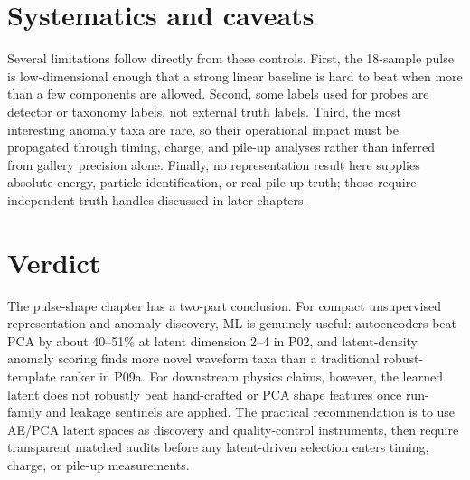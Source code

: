 \section{Systematics and caveats}

\begin{table}[H]
\centering
\caption{Main systematic controls for pulse-shape representation studies.}
\end{table}

Several limitations follow directly from these controls.  First, the 18-sample pulse is
low-dimensional enough that a strong linear baseline is hard to beat when more than a few
components are allowed.  Second, some labels used for probes are detector or taxonomy labels, not
external truth labels.  Third, the most interesting anomaly taxa are rare, so their operational
impact must be propagated through timing, charge, and pile-up analyses rather than inferred from
gallery precision alone.  Finally, no representation result here supplies absolute energy,
particle identification, or real pile-up truth; those require independent truth handles discussed
in later chapters.

\section{Verdict}

The pulse-shape chapter has a two-part conclusion.  For compact unsupervised representation and
anomaly discovery, ML is genuinely useful: autoencoders beat PCA by about 40--51\% at latent
dimension 2--4 in P02, and latent-density anomaly scoring finds more novel waveform taxa than a
traditional robust-template ranker in P09a.  For downstream physics claims, however, the learned
latent does not robustly beat hand-crafted or PCA shape features once run-family and leakage
sentinels are applied.  The practical recommendation is to use AE/PCA latent spaces as discovery
and quality-control instruments, then require transparent matched audits before any latent-driven
selection enters timing, charge, or pile-up measurements.
